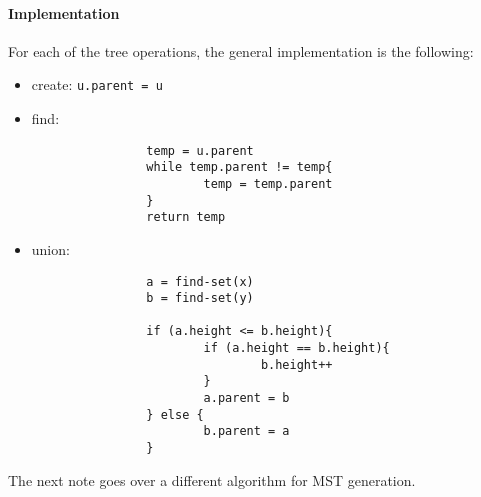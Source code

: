 \documentclass[12pt]{book}
\begin{document}
\paragraph{Implementation}
For each of the tree operations, the general implementation is
the following:
\begin{itemize}
        \item create: \texttt{u.parent = u}
        \item find: 
                \begin{verbatim}
                temp = u.parent
                while temp.parent != temp{
                        temp = temp.parent
                }
                return temp
                \end{verbatim}
        \item union: 
                \begin{verbatim}
                a = find-set(x)
                b = find-set(y)

                if (a.height <= b.height){
                        if (a.height == b.height){
                                b.height++
                        }
                        a.parent = b
                } else {
                        b.parent = a
                }

                \end{verbatim}
\end{itemize}

The next note goes over a different algorithm for MST generation.
\end{document}
